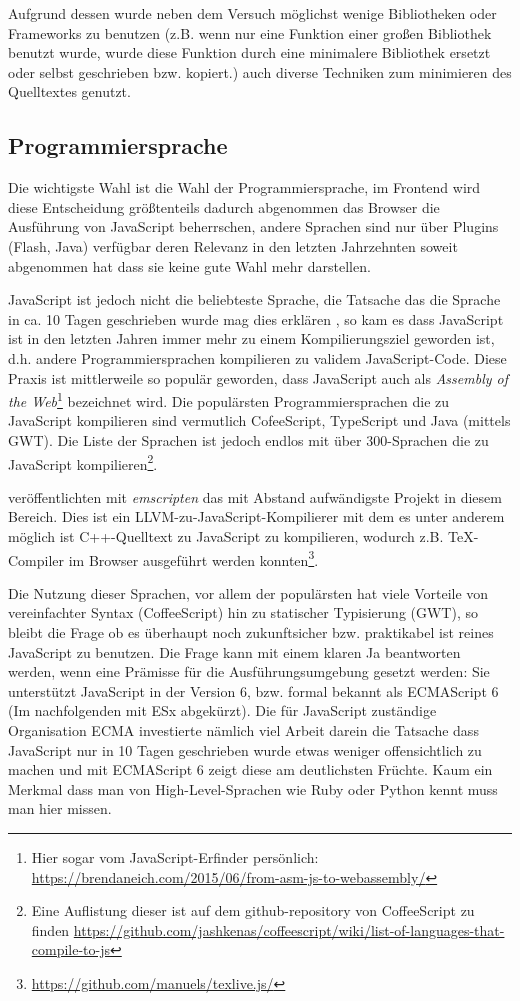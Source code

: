 \documentclass[12pt,twoside]{book}
\begin{document}
Aufgrund dessen wurde neben dem Versuch möglichst wenige Bibliotheken oder Frameworks zu benutzen (z.B. wenn nur eine Funktion einer großen Bibliothek benutzt wurde, wurde diese Funktion durch eine minimalere Bibliothek ersetzt oder selbst geschrieben bzw. kopiert.) auch diverse Techniken zum minimieren des Quelltextes genutzt.

\subsection{Programmiersprache}

Die wichtigste Wahl ist die Wahl der Programmiersprache, im Frontend wird diese Entscheidung größtenteils dadurch abgenommen das Browser die Ausführung von JavaScript beherrschen, andere Sprachen sind nur über Plugins (Flash, Java) verfügbar deren Relevanz in den letzten Jahrzehnten soweit abgenommen hat dass sie keine gute Wahl mehr darstellen.

JavaScript ist jedoch nicht die beliebteste Sprache, die Tatsache das die Sprache in ca. 10 Tagen geschrieben wurde mag dies erklären \citep{severance2012javascript}, so kam es dass JavaScript ist in den letzten Jahren immer mehr zu einem Kompilierungsziel geworden ist, d.h. andere Programmiersprachen kompilieren zu validem JavaScript-Code. Diese Praxis ist mittlerweile so populär geworden, dass JavaScript auch als \textit{Assembly of the Web}\footnote{Hier sogar vom JavaScript-Erfinder persönlich: \url{https://brendaneich.com/2015/06/from-asm-js-to-webassembly/}} bezeichnet wird. Die populärsten Programmiersprachen die zu JavaScript kompilieren sind vermutlich CofeeScript, TypeScript und Java (mittels GWT). Die Liste der Sprachen ist jedoch endlos mit über 300-Sprachen die zu JavaScript kompilieren\footnote{Eine Auflistung dieser ist auf dem github-repository von CoffeeScript zu finden \url{https://github.com/jashkenas/coffeescript/wiki/list-of-languages-that-compile-to-js}}.

\citep{zakai2011emscripten} veröffentlichten mit \textit{emscripten} das mit Abstand aufwändigste Projekt in diesem Bereich. Dies ist ein LLVM-zu-JavaScript-Kompilierer mit dem es unter anderem möglich ist C++-Quelltext zu JavaScript zu kompilieren, wodurch z.B. TeX-Compiler im Browser ausgeführt werden konnten\footnote{\url{https://github.com/manuels/texlive.js/}}.

Die Nutzung dieser Sprachen, vor allem der populärsten hat viele Vorteile von vereinfachter Syntax (CoffeeScript) hin zu statischer Typisierung (GWT), so bleibt die Frage ob es überhaupt noch zukunftsicher bzw. praktikabel ist reines JavaScript zu benutzen.
Die Frage kann mit einem klaren Ja beantworten werden, wenn eine Prämisse für die Ausführungsumgebung gesetzt werden: Sie unterstützt JavaScript in der Version 6, bzw. formal bekannt als ECMAScript 6 (Im nachfolgenden mit ESx abgekürzt).
Die für JavaScript zuständige Organisation ECMA investierte nämlich viel Arbeit darein die Tatsache dass JavaScript nur in 10 Tagen geschrieben wurde etwas weniger offensichtlich zu machen und mit ECMAScript 6 zeigt diese am deutlichsten Früchte. Kaum ein Merkmal dass man von High-Level-Sprachen wie Ruby oder Python kennt muss man hier missen.
\end{document}
